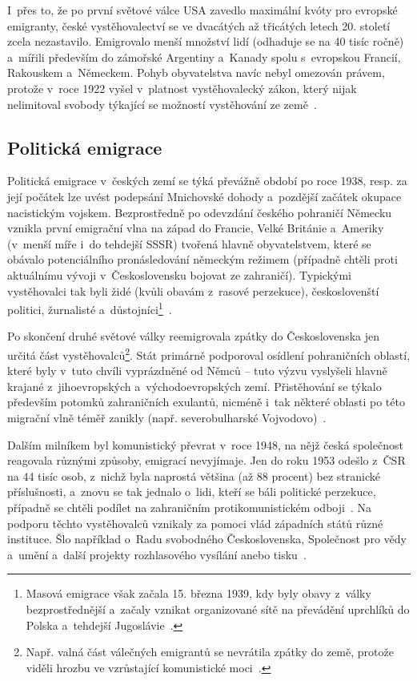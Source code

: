 I~přes to, že po první světové válce USA zavedlo maximální kvóty pro evropské emigranty, české vystěhovalectví se ve dvacátých až třicátých letech 20. století zcela nezastavilo. Emigrovalo menší množství lidí (odhaduje se na 40 tisíc ročně) a~mířili především do zámořské Argentiny a~Kanady spolu s~evropskou Francií, Rakouskem a~Německem. Pohyb obyvatelstva navíc nebyl omezován právem, protože v~roce 1922 vyšel v~platnost vystěhovalecký zákon, který nijak nelimitoval svobody týkající se možností vystěhování ze země~\parencite{Vaculik2009b}.

\hypertarget{politickuxe1-emigrace}{%
\subsection{Politická emigrace}\label{politickuxe1-emigrace}}

Politická emigrace v~českých zemí se týká převážně období po roce 1938, resp. za její počátek lze uvést podepsání Mnichovské dohody a~pozdější začátek okupace nacistickým vojskem. Bezprostředně po odevzdání českého pohraničí Německu vznikla první emigrační vlna na západ do Francie, Velké Británie a~Ameriky (v~menší míře i~do tehdejší SSSR) tvořená hlavně obyvatelstvem, které se obávalo potenciálního pronásledování německým režimem (případně chtěli proti aktuálnímu vývoji v~Československu bojovat ze zahraničí). Typickými vystěhovalci tak byli židé (kvůli obavám z~rasové perzekuce), českoslovenští politici, žurnalisté a~důstojníci\footnote{Masová emigrace však začala 15. března 1939, kdy byly obavy z~války bezprostřednější a~začaly vznikat organizované sítě na převádění uprchlíků do Polska a~tehdejší Jugoslávie~\parencite{Vaculik2002}.}~\parencite{Nespor2005}.

Po skončení druhé světové války reemigrovala zpátky do Československa jen určitá část vystěhovalců\footnote{Např. valná část válečných emigrantů se nevrátila zpátky do země, protože viděli hrozbu ve vzrůstající komunistické moci~\parencite{Vaculik2009a}.}. Stát primárně podporoval osídlení pohraničních oblastí, které byly v~tuto chvíli vyprázdněné od Němců -- tuto výzvu vyslyšeli hlavně krajané z~jihoevropských a~východoevropských zemí. Přistěhování se týkalo především potomků zahraničních exulantů, nicméně i~tak některé oblasti po této migrační vlně téměř zanikly (např. severobulharské Vojvodovo)~\parencite{Nespor2005}.

Dalším milníkem byl komunistický převrat v~roce 1948, na nějž česká společnost reagovala různými způsoby, emigrací nevyjímaje. Jen do roku 1953 odešlo z~ČSR na 44 tisíc osob, z~nichž byla naprostá většina (až 88 procent) bez stranické příslušnosti, a~znovu se tak jednalo o~lidi, kteří se báli politické perzekuce, případně se chtěli podílet na zahraničním protikomunistickém odboji~\parencite{Vaculik2002}. Na podporu těchto vystěhovalců vznikaly za pomoci vlád západních států různé instituce. Šlo například o~Radu svobodného Československa, Společnost pro vědy a~umění a~další projekty rozhlasového vysílání anebo tisku~\parencite{Nespor2005}.


